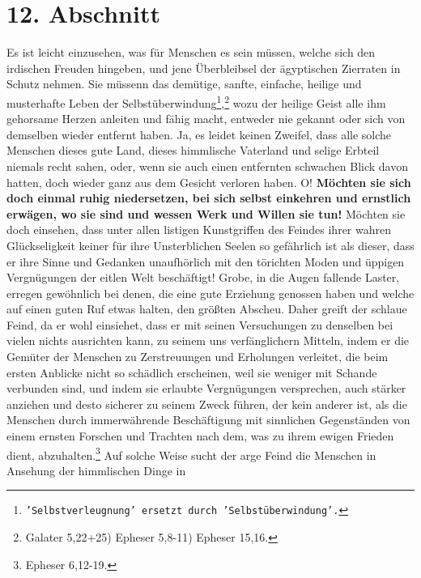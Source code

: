 {\section{12. Abschnitt} \label{kap17_ab12}

Es ist leicht einzusehen, was für Menschen es sein müssen, welche sich den
irdischen Freuden hingeben, und jene Überbleibsel der ägyptischen Zierraten in
Schutz nehmen. Sie müssenn das demütige, sanfte, einfache, heilige und
musterhafte Leben der Selbstüberwindung\footnote{\texttt{'Selbstverleugnung'
ersetzt durch
'Selbstüberwindung'.}},\footnote{Galater 5,22+25) Epheser 5,8-11)
Epheser 15,16.}
wozu der heilige Geist alle ihm gehorsame Herzen anleiten und fähig
macht, entweder nie gekannt oder sich von demselben wieder entfernt haben. Ja,
es leidet keinen Zweifel, dass alle solche Menschen dieses gute Land, dieses
himmlische Vaterland und selige Erbteil niemals recht sahen, oder, wenn sie auch
einen entfernten schwachen Blick davon hatten, doch wieder ganz aus dem Gesicht
verloren haben. O! \label{ref:17_12_einkehr}\textbf{Möchten sie sich doch einmal
ruhig niedersetzen, bei sich
selbst
einkehren und ernstlich erwägen, wo sie sind und wessen Werk und Willen sie
tun!} Möchten sie doch einsehen, dass unter allen listigen Kunstgriffen des
Feindes ihrer wahren Glückseligkeit keiner für ihre Unsterblichen Seelen so
gefährlich ist als dieser, dass er ihre Sinne und Gedanken unaufhörlich mit den
törichten Moden und üppigen Vergnügungen der eitlen Welt beschäftigt! Grobe, in
die Augen fallende Laster, erregen gewöhnlich bei denen, die eine gute Erziehung
genossen haben und welche auf einen guten Ruf etwas halten, den größten
Abscheu. Daher greift der schlaue Feind, da er wohl einsiehet, dass er mit
seinen
Versuchungen zu denselben bei vielen nichts ausrichten kann, zu seinem uns
verfänglichern Mitteln, indem er die Gemüter der Menschen zu Zerstreuungen und
Erholungen verleitet, die beim ersten Anblicke nicht so schädlich erscheinen,
weil sie weniger mit Schande verbunden sind, und indem sie erlaubte Vergnügungen
versprechen, auch stärker anziehen und desto sicherer zu seinem Zweck führen,
der kein anderer ist, als die Menschen durch immerwährende Beschäftigung mit
sinnlichen Gegenständen von einem ernsten Forschen und Trachten nach dem, was zu
ihrem ewigen Frieden dient, abzuhalten.\footnote{Epheser 6,12-19.}
Auf solche
Weise sucht der arge Feind die Menschen in Ansehung der himmlischen Dinge in
}
